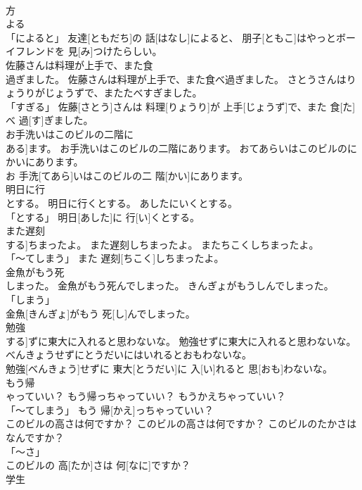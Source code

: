 \documentclass[8pt]{extreport}
\begin{document}
\begin{CJK}{UTF8}{min}
\\	方 
\\	よる 
\\	「によると」	友達[ともだち]の 話[はなし]によると、 朋子[ともこ]はやっとボーイフレンドを 見[み]つけたらしい。		
\\	佐藤さんは料理が上手で、また食
\\	過ぎました。	佐藤さんは料理が上手で、また食べ過ぎました。	さとうさんはりょうりがじょうずで、またたべすぎました。	
\\	「すぎる」	佐藤[さとう]さんは 料理[りょうり]が 上手[じょうず]で、また 食[た]べ 過[す]ぎました。		
\\	お手洗いはこのビルの二階に
\\	ある]ます。	お手洗いはこのビルの二階にあります。	おてあらいはこのビルのにかいにあります。	
\\	お 手洗[てあら]いはこのビルの二 階[かい]にあります。		
\\	明日に行
\\	とする。	明日に行くとする。	あしたにいくとする。	
\\	「とする」	明日[あした]に 行[い]くとする。		
\\	また遅刻
\\	する]ちまったよ。	また遅刻しちまったよ。	またちこくしちまったよ。	
\\	「～てしまう」	また 遅刻[ちこく]しちまったよ。		
\\	金魚がもう死
\\	しまった。	金魚がもう死んでしまった。	きんぎょがもうしんでしまった。	
\\	「しまう」 
\\	金魚[きんぎょ]がもう 死[し]んでしまった。		
\\	勉強
\\	する]ずに東大に入れると思わないな。	勉強せずに東大に入れると思わないな。	べんきょうせずにとうだいにはいれるとおもわないな。	
\\	勉強[べんきょう]せずに 東大[とうだい]に 入[い]れると 思[おも]わないな。		
\\	もう帰
\\	ゃっていい？	もう帰っちゃっていい？	もうかえちゃっていい？	
\\	「～てしまう」	もう 帰[かえ]っちゃっていい？		
\\	このビルの高さは何ですか？	このビルの高さは何ですか？	このビルのたかさはなんですか？	
\\	「～さ」 
\\	このビルの 高[たか]さは 何[なに]ですか？		
\\	学生

\end{CJK}
\end{document}
